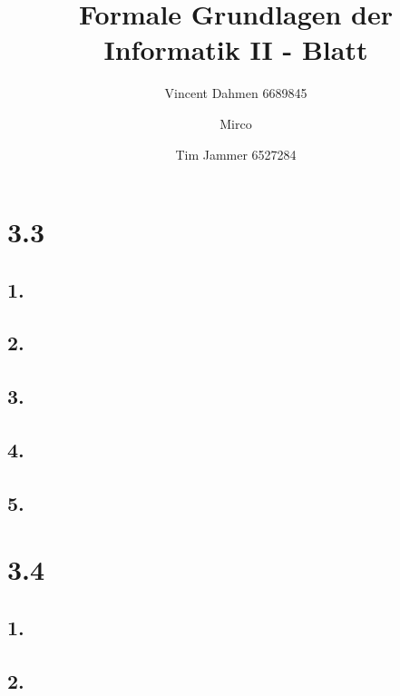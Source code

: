 \documentclass[12pt,a4paper]{article}
\title{Formale Grundlagen der Informatik II - Blatt \blattNr}
\author{Vincent Dahmen 6689845  \and Mirco \and Tim Jammer 6527284}
\begin{document}
\maketitle{}

\section*{3.3}
\subsection*{1.}


\subsection*{2.}


\subsection*{3.}


\subsection*{4.}


\subsection*{5.}


\pagebreak

\section*{3.4}
\subsection*{1.}


\subsection*{2.}

\end{document}
